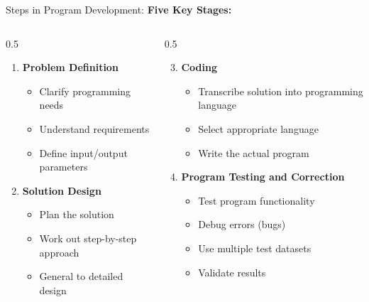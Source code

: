 \documentclass[aspectratio=169]{beamer}
\begin{document}
\begin{frame}{Steps in Program Development: \textbf{Five Key Stages:}} 

    \begin{columns}
        \begin{column}{0.5\textwidth} 
    \begin{enumerate}
    
        \item \textbf{Problem Definition}
        \begin{itemize}
            \item Clarify programming needs
            \item Understand requirements
            \item Define input/output parameters
        \end{itemize}
        
        \item {} \textbf{Solution Design}
        \begin{itemize}
            \item Plan the solution
            \item Work out step-by-step approach
            \item General to detailed design
        \end{itemize}
    \end{enumerate}

    \end{column}


    \begin{column}{0.5\textwidth} 
  
       \begin{enumerate}
        \setcounter{enumi}{2}
        \item {} \textbf{Coding}
        \begin{itemize}
            \item Transcribe solution into programming language
            \item Select appropriate language
            \item Write the actual program
        \end{itemize}
        
        \item {} \textbf{Program Testing and Correction}
        \begin{itemize}
            \item Test program functionality
            \item Debug errors (bugs)
            \item Use multiple test datasets
            \item Validate results
        \end{itemize}
        

\end{enumerate}
\end{column}
\end{columns}
\end{frame}
\end{document}
